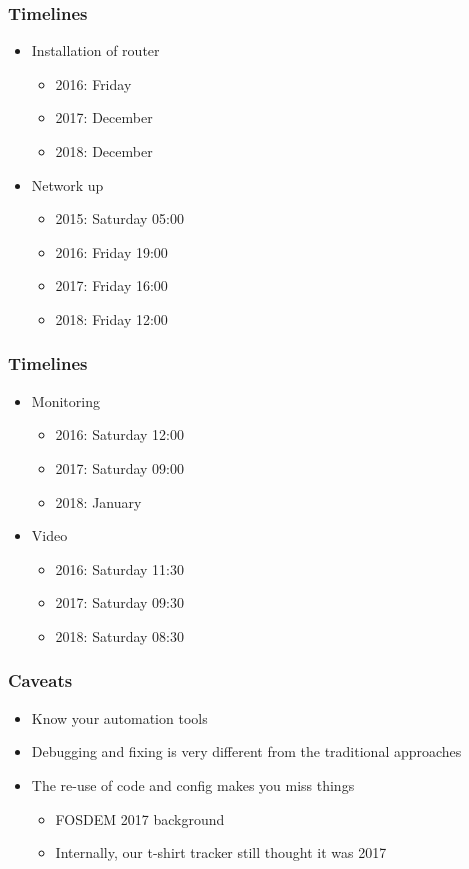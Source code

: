 \documentclass[t]{beamer}
\begin{document}
\begin{frame}
	\frametitle{Timelines}
	\vfill
	\begin{itemize}
		\item Installation of router
		\begin{itemize}
			\item 2016: Friday
			\item 2017: December
			\item 2018: December
		\end{itemize}
		\item Network up
		\begin{itemize}
			\item 2015: Saturday 05:00
			\item 2016: Friday 19:00
			\item 2017: Friday 16:00
			\item 2018: Friday 12:00
		\end{itemize}
	\end{itemize}
	\vfill
\end{frame}

\begin{frame}
	\frametitle{Timelines}
	\begin{itemize}
	\vfill
		\item Monitoring
		\begin{itemize}
			\item 2016: Saturday 12:00
			\item 2017: Saturday 09:00
			\item 2018: January
		\end{itemize}
		\item Video
		\begin{itemize}
			\item 2016: Saturday 11:30
			\item 2017: Saturday 09:30
			\item 2018: Saturday 08:30
		\end{itemize}
	\end{itemize}
	\vfill
\end{frame}


\begin{frame}
	\frametitle{Caveats}
	\vfill
	\begin{itemize}
		\item Know your automation tools
		\item Debugging and fixing is very different from the traditional approaches
		\item The re-use of code and config makes you miss things
		\begin{itemize}
			\item FOSDEM 2017 background
			\item Internally, our t-shirt tracker still thought it was 2017
		\end{itemize}
	\end{itemize}
	\vfill
\end{frame}
\end{document}
